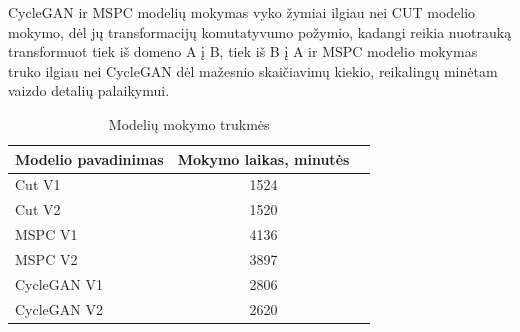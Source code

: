 \documentclass{VUMIFPSkursinis}
\begin{document}
            CycleGAN ir MSPC modelių mokymas vyko žymiai ilgiau nei CUT modelio mokymo, dėl jų transformacijų komutatyvumo požymio, kadangi reikia nuotrauką transformuot tiek iš domeno A į B, tiek iš B į A ir MSPC modelio mokymas truko ilgiau nei CycleGAN dėl mažesnio skaičiavimų kiekio, reikalingų minėtam vaizdo detalių palaikymui.
            \begin{table}[H]\footnotesize
              \centering
              \caption{Modelių mokymo trukmės}
              {\begin{tabular}{|l|c|c|} \hline
                Modelio pavadinimas & Mokymo laikas, minutės\\
                \hline
                Cut V1 & 1524 \\
                Cut V2 & 1520 \\ 
                MSPC V1 & 4136 \\
                MSPC V2 & 3897 \\
                CycleGAN V1 & 2806 \\
                CycleGAN V2 & 2620 \\
                \hline
              \end{tabular}}
              \label{tab:table example}
            \end{table}
\end{document}
